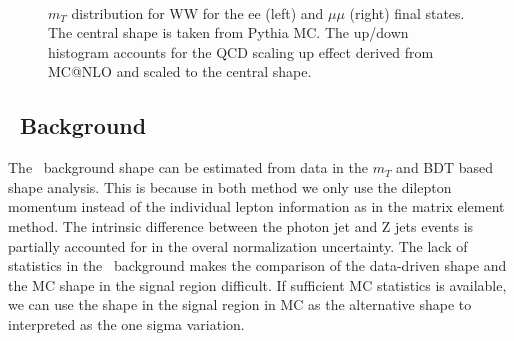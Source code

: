 \begin{figure}[!htbp]
\begin{center}
\\
\caption{$m_T$ distribution for WW for the ee (left) and $\mu\mu$ (right) final states. 
The central shape is taken from Pythia MC. The up/down histogram accounts for the QCD scaling up effect
derived from MC@NLO and scaled to the central shape. 
}
\label{fig:wwnlosyst_hzz}	
\end{center}
\end{figure}

\subsection{\dyll\  Background}

The \dyll\  background shape can be estimated from data in the $m_T$ and BDT based 
shape analysis. This is because in both method we only use the dilepton momentum 
instead of the individual lepton information as in the matrix element method. 
The intrinsic difference between the photon jet and Z jets events is partially
accounted for in the overal normalization uncertainty. 
The lack of statistics in the \dyll\  background makes the comparison of the 
data-driven shape and the MC shape in the signal region difficult. 
If sufficient MC statistics is available, we can use the shape in the signal region in MC as 
the alternative shape to interpreted as the one sigma variation. 




